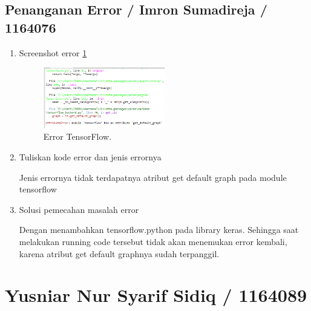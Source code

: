 \subsection{Penanganan Error / Imron Sumadireja / 1164076}
\begin{enumerate}
\item Screenshot error \ref{nn1}
		\begin{figure}[!htbp]
		\centerline{\includegraphics[width=0.5\textwidth]{figures/im/errorNN1.png}}
		\caption{Error TensorFlow.}
		\label{nn1}
		\end{figure}
\item Tuliskan kode error dan jenis errornya

Jenis errornya tidak terdapatnya atribut get default graph pada module tensorflow

\item Solusi pemecahan masalah error

Dengan menambahkan tensorflow.python pada library keras. Sehingga saat melakukan running code tersebut tidak akan menemukan error kembali, karena atribut get default graphnya sudah terpanggil.
\end{enumerate}

\section{Yusniar Nur Syarif Sidiq / 1164089}

